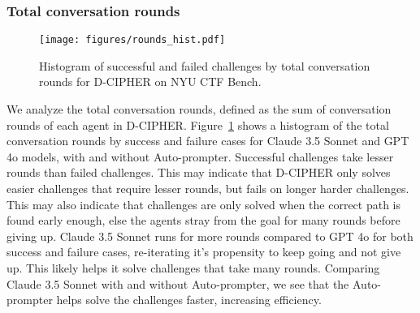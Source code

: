 
\subsubsection{Total conversation rounds}

\begin{figure}[htpb]
    \centering
    \texttt{[image: figures/rounds\_hist.pdf]}
    \caption{Histogram of successful and failed challenges by total conversation rounds for D-CIPHER on NYU CTF Bench.}
    \label{fig:conversation_rounds}
\end{figure}

We analyze the total conversation rounds, defined as the sum of conversation rounds of each agent in D-CIPHER.
Figure~\ref{fig:conversation_rounds} shows a histogram of the total conversation rounds by success and failure cases for Claude 3.5 Sonnet and GPT 4o models, with and without Auto-prompter.
Successful challenges take lesser rounds than failed challenges. This may indicate that D-CIPHER only solves easier challenges that require lesser rounds, but fails on longer harder challenges. This may also indicate that challenges are only solved when the correct path is found early enough, else the agents stray from the goal for many rounds before giving up.
Claude 3.5 Sonnet runs for more rounds compared to GPT 4o for both success and failure cases, re-iterating it's propensity to keep going and not give up.
This likely helps it solve challenges that take many rounds.
Comparing Claude 3.5 Sonnet with and without Auto-prompter, we see that the Auto-prompter helps solve the challenges faster, increasing efficiency.


